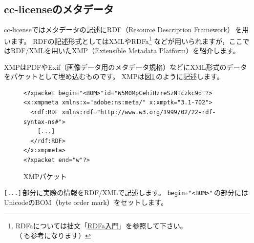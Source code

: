 \documentclass{ltjsarticle}
\begin{document}
\subsection{cc-licenseのメタデータ} \label{sec:metadata}

cc-licenseではメタデータの記述にRDF（Resource Description Framework）\cite{Book:KANZAKI-RDF}\,を用います。
RDFの記述形式としてはXMLやRDFa\footnote{RDFaについては拙文「\href{http://www.baldanders.info/spiegel/archive/rdfa/}{RDFa入門}」を参照して下さい。（\cite{Book:KANZAKI-SHX}\,も参考になります）
} などが用いられますが，ここではRDF/XMLを用いたXMP（Extensible Metadata Platform）を紹介します。

XMPはPDFやExif（画像データ用のメタデータ規格）などにXML形式のデータをパケットとして埋め込むものです。
XMPは図\ref{fig:xmp}\,のように記述します。
\begin{figure}[htp]
\begin{mdframed}
\small
\begin{verbatim}
<?xpacket begin="<BOM>"﻿id="W5M0MpCehiHzreSzNTczkc9d"?>
<x:xmpmeta xmlns:x="adobe:ns:meta/" x:xmptk="3.1-702">
  <rdf:RDF xmlns:rdf="http://www.w3.org/1999/02/22-rdf-syntax-ns#">
    [...]
  </rdf:RDF>
</x:xmpmeta>
<?xpacket end="w"?>
\end{verbatim}
\end{mdframed}
\caption{XMPパケット} \label{fig:xmp}
\end{figure}%
\verb|[...]|\,部分に実際の情報をRDF/XMLで記述します。
\verb|begin="<BOM>"|\,の部分にはUnicodeのBOM（byte order mark）をセットします。
\end{document}
